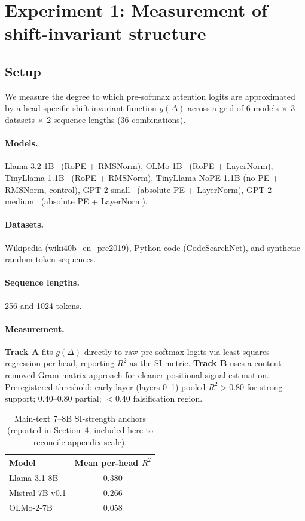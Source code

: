 \documentclass{article}
\begin{document}
\section{Experiment 1: Measurement of shift-invariant structure}
\label{app:exp1}

\subsection{Setup}

We measure the degree to which pre-softmax attention logits are approximated by a
head-specific shift-invariant function $g(\Delta)$ across a grid of 6 models $\times$ 3
datasets $\times$ 2 sequence lengths (36 combinations).

\paragraph{Models.} Llama-3.2-1B~\citep{dubey2024llama3} (RoPE + RMSNorm),
OLMo-1B~\citep{groeneveld2024olmo} (RoPE + LayerNorm),
TinyLlama-1.1B~\citep{zhang2024tinyllama} (RoPE + RMSNorm),
TinyLlama-NoPE-1.1B (no PE + RMSNorm, control),
GPT-2 small~\citep{radford2019language} (absolute PE + LayerNorm),
GPT-2 medium~\citep{radford2019language} (absolute PE + LayerNorm).

\paragraph{Datasets.} Wikipedia (wiki40b\_en\_pre2019), Python code (CodeSearchNet), and
synthetic random token sequences.

\paragraph{Sequence lengths.} 256 and 1024 tokens.

\paragraph{Measurement.} \textbf{Track A} fits $g(\Delta)$ directly to raw pre-softmax
logits via least-squares regression per head, reporting $R^2$ as the SI metric.
\textbf{Track B} uses a content-removed Gram matrix approach for cleaner positional signal
estimation. Preregistered threshold: early-layer (layers 0--1) pooled $R^2 > 0.80$ for
strong support; $0.40$--$0.80$ partial; $< 0.40$ falsification region.

\begin{table}[htbp]
\centering
\small
\caption{Main-text 7--8B SI-strength anchors (reported in Section~4; included here to reconcile appendix scale).}
\label{tab:appa_7b_r2_anchor}
\begin{tabular}{lc}
\toprule
Model & Mean per-head $R^2$ \\
\midrule
Llama-3.1-8B & 0.380 \\
Mistral-7B-v0.1 & 0.266 \\
OLMo-2-7B & 0.058 \\
\bottomrule
\end{tabular}
\end{table}
\end{document}
